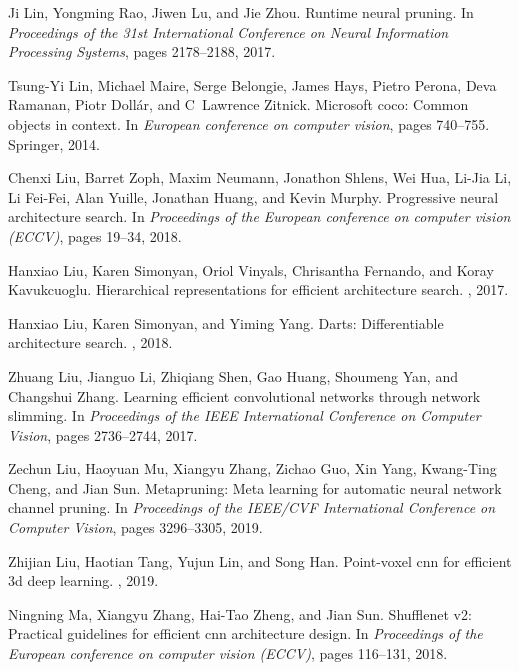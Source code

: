 \documentclass[10pt,twocolumn,letterpaper]{article}
\begin{document}
{\begin{thebibliography}{10}
Ji Lin, Yongming Rao, Jiwen Lu, and Jie Zhou.
\newblock Runtime neural pruning.
\newblock In {\em Proceedings of the 31st International Conference on Neural
  Information Processing Systems}, pages 2178--2188, 2017.

Tsung-Yi Lin, Michael Maire, Serge Belongie, James Hays, Pietro Perona, Deva
  Ramanan, Piotr Doll{\'a}r, and C~Lawrence Zitnick.
\newblock Microsoft coco: Common objects in context.
\newblock In {\em European conference on computer vision}, pages 740--755.
  Springer, 2014.

Chenxi Liu, Barret Zoph, Maxim Neumann, Jonathon Shlens, Wei Hua, Li-Jia Li, Li
  Fei-Fei, Alan Yuille, Jonathan Huang, and Kevin Murphy.
\newblock Progressive neural architecture search.
\newblock In {\em Proceedings of the European conference on computer vision
  (ECCV)}, pages 19--34, 2018.

Hanxiao Liu, Karen Simonyan, Oriol Vinyals, Chrisantha Fernando, and Koray
  Kavukcuoglu.
\newblock Hierarchical representations for efficient architecture search.
, 2017.

Hanxiao Liu, Karen Simonyan, and Yiming Yang.
\newblock Darts: Differentiable architecture search.
, 2018.

Zhuang Liu, Jianguo Li, Zhiqiang Shen, Gao Huang, Shoumeng Yan, and Changshui
  Zhang.
\newblock Learning efficient convolutional networks through network slimming.
\newblock In {\em Proceedings of the IEEE International Conference on Computer
  Vision}, pages 2736--2744, 2017.

Zechun Liu, Haoyuan Mu, Xiangyu Zhang, Zichao Guo, Xin Yang, Kwang-Ting Cheng,
  and Jian Sun.
\newblock Metapruning: Meta learning for automatic neural network channel
  pruning.
\newblock In {\em Proceedings of the IEEE/CVF International Conference on
  Computer Vision}, pages 3296--3305, 2019.

Zhijian Liu, Haotian Tang, Yujun Lin, and Song Han.
\newblock Point-voxel cnn for efficient 3d deep learning.
, 2019.

Ningning Ma, Xiangyu Zhang, Hai-Tao Zheng, and Jian Sun.
\newblock Shufflenet v2: Practical guidelines for efficient cnn architecture
  design.
\newblock In {\em Proceedings of the European conference on computer vision
  (ECCV)}, pages 116--131, 2018.


\end{thebibliography}}
\end{document}
